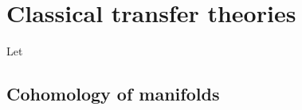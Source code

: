 \documentclass[main.tex]{subfiles}
\begin{document}
\chapter{Classical transfer theories}
\label{ch:classical_transfer_theories}

Let

\section{Cohomology of manifolds}
\label{sec:cohomology_of_manifolds}
\end{document}
